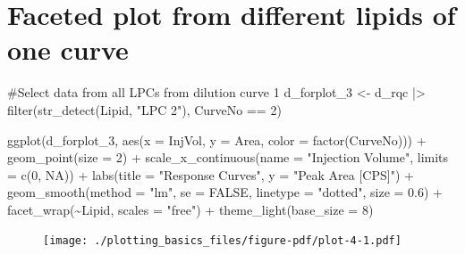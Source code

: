 \documentclass[
  letterpaper,
  DIV=11,
  numbers=noendperiod]{scrreprt}
\newenvironment{Shaded}{\begin{snugshade}}{\end{snugshade}}
\newcommand{\AttributeTok}[1]{\textcolor[rgb]{0.40,0.45,0.13}{#1}}
\newcommand{\CommentTok}[1]{\textcolor[rgb]{0.37,0.37,0.37}{#1}}
\newcommand{\ConstantTok}[1]{\textcolor[rgb]{0.56,0.35,0.01}{#1}}
\newcommand{\DecValTok}[1]{\textcolor[rgb]{0.68,0.00,0.00}{#1}}
\newcommand{\FloatTok}[1]{\textcolor[rgb]{0.68,0.00,0.00}{#1}}
\newcommand{\FunctionTok}[1]{\textcolor[rgb]{0.28,0.35,0.67}{#1}}
\newcommand{\NormalTok}[1]{\textcolor[rgb]{0.00,0.23,0.31}{#1}}
\newcommand{\OtherTok}[1]{\textcolor[rgb]{0.00,0.23,0.31}{#1}}
\newcommand{\SpecialCharTok}[1]{\textcolor[rgb]{0.37,0.37,0.37}{#1}}
\newcommand{\StringTok}[1]{\textcolor[rgb]{0.13,0.47,0.30}{#1}}
\begin{document}
\hypertarget{faceted-plot-from-different-lipids-of-one-curve}{%
\section{Faceted plot from different lipids of one
curve}\label{faceted-plot-from-different-lipids-of-one-curve}}

\begin{Shaded}
\begin{Highlighting}[]
\CommentTok{\#Select data from all LPCs from  dilution curve 1}
\NormalTok{d\_forplot\_3 }\OtherTok{\textless{}{-}}\NormalTok{ d\_rqc  }\SpecialCharTok{|\textgreater{}} \FunctionTok{filter}\NormalTok{(}\FunctionTok{str\_detect}\NormalTok{(Lipid, }\StringTok{"LPC 2"}\NormalTok{), CurveNo }\SpecialCharTok{==} \DecValTok{2}\NormalTok{)}

\FunctionTok{ggplot}\NormalTok{(d\_forplot\_3, }\FunctionTok{aes}\NormalTok{(}\AttributeTok{x =}\NormalTok{ InjVol, }\AttributeTok{y =}\NormalTok{ Area, }\AttributeTok{color =} \FunctionTok{factor}\NormalTok{(CurveNo))) }\SpecialCharTok{+} 
  \FunctionTok{geom\_point}\NormalTok{(}\AttributeTok{size =} \DecValTok{2}\NormalTok{) }\SpecialCharTok{+}
  \FunctionTok{scale\_x\_continuous}\NormalTok{(}\AttributeTok{name =} \StringTok{"Injection Volume"}\NormalTok{, }\AttributeTok{limits =} \FunctionTok{c}\NormalTok{(}\DecValTok{0}\NormalTok{, }\ConstantTok{NA}\NormalTok{)) }\SpecialCharTok{+} 
  \FunctionTok{labs}\NormalTok{(}\AttributeTok{title =} \StringTok{"Response Curves"}\NormalTok{, }\AttributeTok{y =} \StringTok{"Peak Area [CPS]"}\NormalTok{) }\SpecialCharTok{+}
  \FunctionTok{geom\_smooth}\NormalTok{(}\AttributeTok{method =} \StringTok{"lm"}\NormalTok{, }\AttributeTok{se =} \ConstantTok{FALSE}\NormalTok{, }\AttributeTok{linetype =} \StringTok{"dotted"}\NormalTok{, }\AttributeTok{size =} \FloatTok{0.6}\NormalTok{) }\SpecialCharTok{+}
  \FunctionTok{facet\_wrap}\NormalTok{(}\SpecialCharTok{\textasciitilde{}}\NormalTok{Lipid, }\AttributeTok{scales =} \StringTok{"free"}\NormalTok{) }\SpecialCharTok{+}
  \FunctionTok{theme\_light}\NormalTok{(}\AttributeTok{base\_size =} \DecValTok{8}\NormalTok{)}
\end{Highlighting}
\end{Shaded}

\begin{figure}[H]

{\centering \texttt{[image: ./plotting\_basics\_files/figure-pdf/plot-4-1.pdf]}

}

\end{figure}
\end{document}
